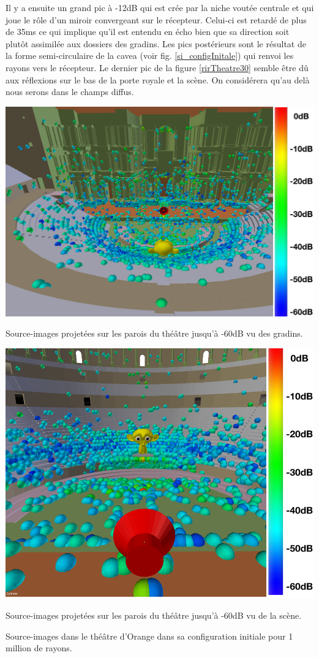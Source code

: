 Il y a ensuite un grand pic à -12dB qui est crée par la niche voutée centrale et qui joue le rôle d'un miroir convergeant sur le récepteur. Celui-ci est retardé de plus de 35ms ce qui implique qu'il est entendu en écho bien que sa direction soit plutôt assimilée aux dossiers des gradins. Les pics postérieurs sont le résultat de la forme semi-circulaire de la \gls{cavea} (voir fig. \ref{si_configInitale}) qui renvoi les rayons vers le récepteur. Le dernier pic de la figure \ref{rirTheatre30} semble être dû aux réflexions sur le bas de la porte royale et la scène. On considérera qu'au delà nous serons dans le champs diffus. 
%
\begin{figureth}
	\begin{subfigureth}{0.8\textwidth}
		\includegraphics[width=\linewidth]{images/SI60dB}
		\caption{Source-images projetées sur les parois du théâtre jusqu'à -60dB vu des gradins.}
		\label{SI60dB}
		\hfill
		\quad
	\end{subfigureth}
	
	\begin{subfigureth}{0.8\textwidth}
		\includegraphics[width=\linewidth]{images/SI60dBbis}
		\caption{Source-images projetées sur les parois du théâtre jusqu'à -60dB vu de la scène.}
		\label{SI60dBbis}
		\quad
	\end{subfigureth} 
\caption{Source-images dans le théâtre d'Orange dans sa configuration initiale pour 1 million de rayons.}	
\label{SITheatre60}
\end{figureth}
